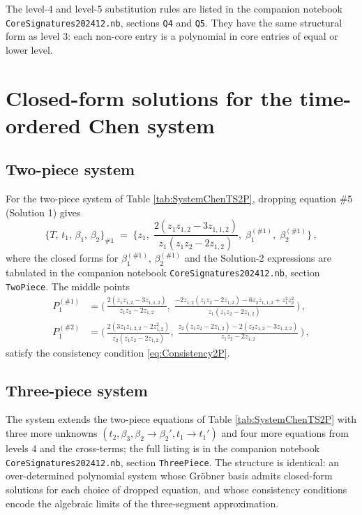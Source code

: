 \documentclass[12pt,english]{article}
\newcommand{\nbfile}[1]{\nolinkurl{#1}}
\theoremstyle{remark}
\begin{document}
The level-4 and level-5 substitution rules are listed in the companion
notebook \nbfile{CoreSignatures202412.nb}, sections \texttt{Q4} and
\texttt{Q5}. They have the same structural form as level 3: each
non-core entry is a polynomial in core entries of equal or lower level.

\section{Closed-form solutions for the time-ordered Chen system\label{app:ChenSolutions}}

\subsection{Two-piece system}

For the two-piece system of Table \ref{tab:SystemChenTS2P}, dropping
equation $\#5$ (Solution 1) gives
\begin{equation}
\bigl\{ T,\,t_{1},\,\beta_{1},\,\beta_{2}\bigr\}_{\#1}\;=\;\biggl\{ z_{1},\;\frac{2(z_{1}z_{1,2}-3z_{1,1,2})}{z_{1}(z_{1}z_{2}-2z_{1,2})},\;\beta_{1}^{(\#1)},\;\beta_{2}^{(\#1)}\biggr\}\,,
\end{equation}
where the closed forms for $\beta_{1}^{(\#1)}$, $\beta_{2}^{(\#1)}$
and the Solution-2 expressions are tabulated in the companion notebook
\nbfile{CoreSignatures202412.nb}, section \texttt{TwoPiece}. The middle
points
\begin{align}
P_{1}^{(\#1)} & =\biggl(\,\frac{2(z_{1}z_{1,2}-3z_{1,1,2})}{z_{1}z_{2}-2z_{1,2}},\;\frac{-2z_{1,2}(z_{1}z_{2}-2z_{1,2})-6z_{2}z_{1,1,2}+z_{1}^{2}z_{2}^{2}}{z_{1}(z_{1}z_{2}-2z_{1,2})}\,\biggr)\,,\\[2pt]
P_{1}^{(\#2)} & =\biggl(\,\frac{2(3z_{1}z_{1,2,2}-2z_{1,2}^{2})}{z_{2}(z_{1}z_{2}-2z_{1,2})},\;\frac{z_{2}(z_{1}z_{2}-2z_{1,2})-2(z_{2}z_{1,2}-3z_{1,2,2})}{z_{1}z_{2}-2z_{1,2}}\,\biggr)\,,
\end{align}
satisfy the consistency condition \eqref{eq:Consistency2P}.

\subsection{Three-piece system}

The system extends the two-piece equations of Table \ref{tab:SystemChenTS2P}
with three more unknowns $(t_{2},\beta_{3},\beta_{2}\to\beta_{2}',t_{1}\to t_{1}')$
and four more equations from levels 4 and the cross-terms; the full
listing is in the companion notebook \nbfile{CoreSignatures202412.nb},
section \texttt{ThreePiece}. The structure is identical: an over-determined
polynomial system whose Gröbner basis admits closed-form solutions
for each choice of dropped equation, and whose consistency conditions
encode the algebraic limits of the three-segment approximation.
\end{document}
